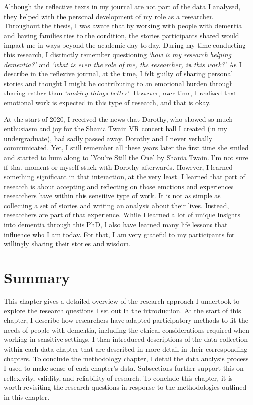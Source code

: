 Although the reflective texts in my journal are not part of the data I analysed, they helped with the personal development of my role as a researcher. Throughout the thesis, I was aware that by working with people with dementia and having families ties to the condition, the stories participants shared would impact me in ways beyond the academic day-to-day. During my time conducting this research, I distinctly remember questioning \textit{`how is my research helping dementia?'} and \textit{`what is even the role of me, the researcher, in this work?'} As I describe in the reflexive journal, at the time, I felt guilty of sharing personal stories and thought I might be contributing to an emotional burden through sharing rather than \textit{`making things better'}. However, over time, I realised that emotional work is expected in this type of research, and that is okay. 

At the start of 2020, I received the news that Dorothy, who showed so much enthusiasm and joy for the Shania Twain VR concert hall I created (in my undergraduate), had sadly passed away. Dorothy and I never verbally communicated. Yet, I still remember all these years later the first time she smiled and started to hum along to 'You're Still the One' by Shania Twain. I'm not sure if that moment or myself stuck with Dorothy afterwards. However, I learned something significant in that interaction, at the very least. I learned that part of research is about accepting and reflecting on those emotions and experiences researchers have within this sensitive type of work. It is not as simple as collecting a set of stories and writing an analysis about their lives. Instead, researchers are part of that experience. While I learned a lot of unique insights into dementia through this PhD, I also have learned many life lessons that influence who I am today. For that, I am very grateful to my participants for willingly sharing their stories and wisdom.

\section{Summary}
\label{Method:summary}
This chapter gives a detailed overview of the research approach I undertook to explore the research questions I set out in the introduction. At the start of this chapter, I describe how researchers have adapted participatory methods to fit the needs of people with dementia, including the ethical considerations required when working in sensitive settings. I then introduced descriptions of the data collection within each data chapter that are described in more detail in their corresponding chapters. To conclude the methodology chapter, I detail the data analysis process I used to make sense of each chapter's data. Subsections further support this on reflexivity, validity, and reliability of research. To conclude this chapter, it is worth revisiting the research questions in response to the methodologies outlined in this chapter.

